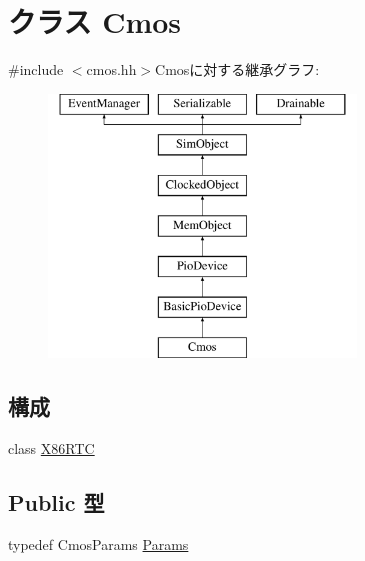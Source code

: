 \hypertarget{classX86ISA_1_1Cmos}{
\section{クラス Cmos}
\label{classX86ISA_1_1Cmos}
}


{\ttfamily \#include $<$cmos.hh$>$}Cmosに対する継承グラフ:\begin{figure}[H]
\begin{center}
\leavevmode
\includegraphics[height=7cm]{classX86ISA_1_1Cmos}
\end{center}
\end{figure}
\subsection*{構成}
\begin{DoxyCompactItemize}
\item 
class \hyperlink{classX86ISA_1_1Cmos_1_1X86RTC}{X86RTC}
\end{DoxyCompactItemize}
\subsection*{Public 型}
\begin{DoxyCompactItemize}
\item 
typedef CmosParams \hyperlink{classX86ISA_1_1Cmos_a22dfc4a3fb18df74d309b9996cd9943c}{Params}
\end{DoxyCompactItemize}
